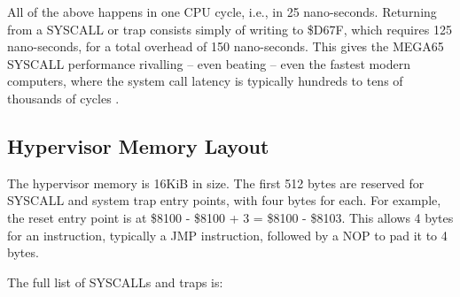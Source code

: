 All of the above happens in one CPU cycle, i.e., in 25 nano-seconds.
Returning from a SYSCALL or trap consists simply of writing to \$D67F, which
requires 125 nano-seconds, for a total overhead of 150 nano-seconds.
This gives the MEGA65 SYSCALL performance rivalling -- even beating
-- even the fastest modern computers, where the system call latency is
typically hundreds to tens of thousands of cycles \cite{soares2010flexsc}.

\subsection{Hypervisor Memory Layout}

The hypervisor memory is 16KiB in size.  The first 512 bytes are
reserved for SYSCALL and system trap entry
points, with four bytes for each.  For example, the reset entry point is
at \$8100 - \$8100 + 3 = \$8100 - \$8103.
This allows 4 bytes for an instruction, typically a JMP instruction,
followed by a NOP to pad it to 4 bytes.

The full list of SYSCALLs and traps is:

